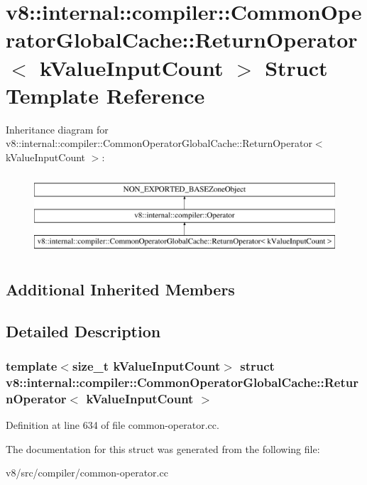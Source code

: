 \hypertarget{structv8_1_1internal_1_1compiler_1_1CommonOperatorGlobalCache_1_1ReturnOperator}{}\section{v8\+:\+:internal\+:\+:compiler\+:\+:Common\+Operator\+Global\+Cache\+:\+:Return\+Operator$<$ k\+Value\+Input\+Count $>$ Struct Template Reference}
\label{structv8_1_1internal_1_1compiler_1_1CommonOperatorGlobalCache_1_1ReturnOperator}
Inheritance diagram for v8\+:\+:internal\+:\+:compiler\+:\+:Common\+Operator\+Global\+Cache\+:\+:Return\+Operator$<$ k\+Value\+Input\+Count $>$\+:\begin{figure}[H]
\begin{center}
\leavevmode
\includegraphics[height=3.000000cm]{structv8_1_1internal_1_1compiler_1_1CommonOperatorGlobalCache_1_1ReturnOperator}
\end{center}
\end{figure}
\subsection*{Additional Inherited Members}


\subsection{Detailed Description}
\subsubsection*{template$<$size\+\_\+t k\+Value\+Input\+Count$>$\newline
struct v8\+::internal\+::compiler\+::\+Common\+Operator\+Global\+Cache\+::\+Return\+Operator$<$ k\+Value\+Input\+Count $>$}



Definition at line 634 of file common-\/operator.\+cc.



The documentation for this struct was generated from the following file\+:\begin{DoxyCompactItemize}
\item 
v8/src/compiler/common-\/operator.\+cc\end{DoxyCompactItemize}
